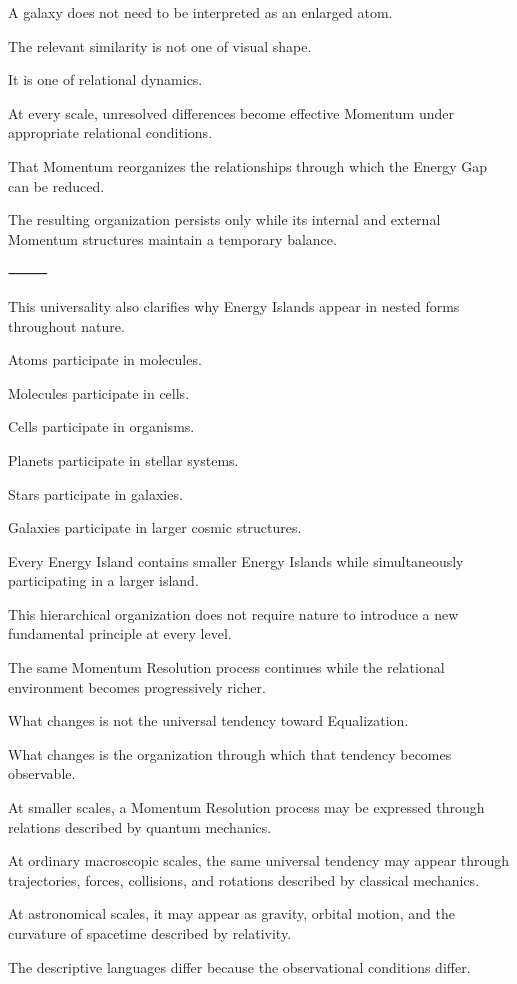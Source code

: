 A galaxy does not need to be interpreted as an enlarged atom.

The relevant similarity is not one of visual shape.

It is one of relational dynamics.

At every scale, unresolved differences become effective Momentum under appropriate relational conditions.

That Momentum reorganizes the relationships through which the Energy Gap can be reduced.

The resulting organization persists only while its internal and external Momentum structures maintain a temporary balance.

⸻

This universality also clarifies why Energy Islands appear in nested forms throughout nature.

Atoms participate in molecules.

Molecules participate in cells.

Cells participate in organisms.

Planets participate in stellar systems.

Stars participate in galaxies.

Galaxies participate in larger cosmic structures.

Every Energy Island contains smaller Energy Islands while simultaneously participating in a larger island.

This hierarchical organization does not require nature to introduce a new fundamental principle at every level.

The same Momentum Resolution process continues while the relational environment becomes progressively richer.

What changes is not the universal tendency toward Equalization.

What changes is the organization through which that tendency becomes observable.

At smaller scales, a Momentum Resolution process may be expressed through relations described by quantum mechanics.

At ordinary macroscopic scales, the same universal tendency may appear through trajectories, forces, collisions, and rotations described by classical mechanics.

At astronomical scales, it may appear as gravity, orbital motion, and the curvature of spacetime described by relativity.

The descriptive languages differ because the observational conditions differ.

